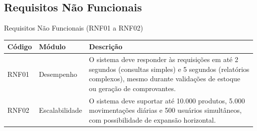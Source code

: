\documentclass[
	12pt,				%
	openany,			%
	twoside,			%
	a4paper,			%
	english,			%
	brazil				%
	]{abntex2}
\begin{document}
\FloatBarrier



\subsection{Requisitos Não Funcionais}



\begin{quadro}[htb]
\caption{\label{quadro_rnf1}Requisitos Não Funcionais (RNF01 a RNF02)}
\begin{tabular}{|p{1.2cm}|p{3.5cm}|p{11.0cm}|}
    \hline
    \textbf{Código} & \textbf{Módulo} & \textbf{Descrição} \\ \hline

    RNF01 & Desempenho & O sistema deve responder às requisições em até 2 segundos (consultas simples) e 5 segundos (relatórios complexos), mesmo durante validações de estoque ou geração de comprovantes. \\ \hline

    RNF02 & Escalabilidade & O sistema deve suportar até 10.000 produtos, 5.000 movimentações diárias e 500 usuários simultâneos, com possibilidade de expansão horizontal. \\ \hline

    

 

\end{tabular}
\end{quadro}

\FloatBarrier
\end{document}
